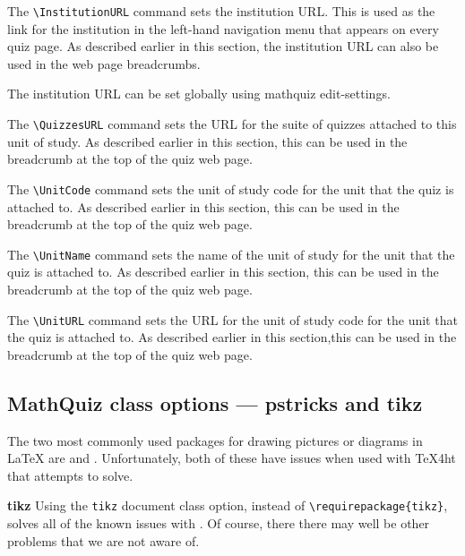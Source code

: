 \documentclass[svgnames]{article}
\newcommand\ddash{\texttt{\textemdash\textemdash}}
\newcommand\mathquizopt[1]{\textsf{mathquiz \ddash#1}}
\begin{document}
\begin{description}
    The \Verb|\InstitutionURL| command sets the institution URL. This is
    used as the link for the \textsf{institution} in the left-hand
    navigation menu that appears on every quiz page.  As described
    earlier in this section, the institution URL can also be used in the
    web page breadcrumbs.

    The institution URL can be set globally using \mathquizopt{edit-settings}.

    The \Verb|\QuizzesURL| command sets the URL for the suite of quizzes attached to this unit of study. As described earlier in this section,
    this can be used in the breadcrumb at the top of the
    quiz web page.

    The \Verb|\UnitCode| command sets the unit of study code for the
    unit that the quiz is attached to. As described earlier in this
    section, this can be used in the breadcrumb at the top of the quiz
    web page.

    The \Verb|\UnitName| command sets the name of the unit of study for
    the unit that the quiz is attached to. As described earlier in this
    section, this can be used in the breadcrumb at the top of the quiz
    web page.

    The \Verb|\UnitURL| command sets the URL for the unit of study code
    for the unit that the quiz is attached to. As described earlier in
    this section,this can be used in the breadcrumb at the top of the
    quiz web page.

\end{description}

  \subsection{MathQuiz class options --- pstricks and tikz}\label{SS:classOptions}

The two most commonly used packages for drawing pictures or diagrams in
\LaTeX{} are  and . Unfortunately, both of
these have issues when used with \TeX 4ht that \MathQuiz attempts to
solve.


\noindent\textbf{tikz}
Using the \Verb|tikz| document class option, instead of
\Verb|\requirepackage{tikz}|, solves all of the known issues with
. Of course, there  there may well be other problems
that we are not aware of.
\end{document}
